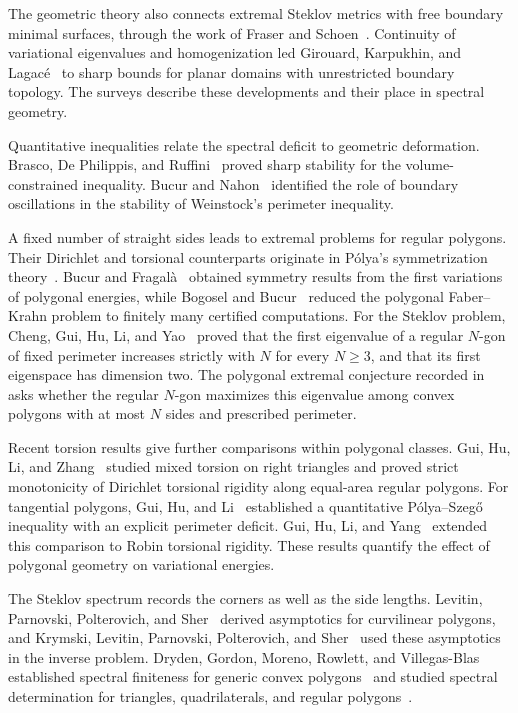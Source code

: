 \documentclass[11pt]{amsart}
\theoremstyle{remark}\newtheorem{remark}[theorem]{Remark}
\numberwithin{equation}{section}
\begin{document}
The geometric theory also connects extremal Steklov metrics with free
boundary minimal surfaces, through the work of Fraser and
Schoen~\cite{FraserSchoen2011,FraserSchoen2016}.
Continuity of variational eigenvalues and homogenization led Girouard,
Karpukhin, and Lagac\'e~\cite{GirouardKarpukhinLagace2021} to sharp bounds
for planar domains with unrestricted boundary topology. The surveys
\cite{GirouardPolterovich2017,ColboisEtAl2024} describe these developments
and their place in spectral geometry.

Quantitative inequalities relate the spectral deficit to geometric
deformation. Brasco, De Philippis, and Ruffini~\cite{BrascoEtAl2012}
proved sharp stability for the volume-constrained inequality.
Bucur and Nahon~\cite{BucurNahon2021} identified the role of boundary
oscillations in the stability of Weinstock's perimeter inequality.

A fixed number of straight sides leads to extremal problems for regular
polygons. Their Dirichlet and torsional counterparts originate in
P\'olya's symmetrization theory~\cite{Polya1948}.
Bucur and Fragal\`a~\cite{BucurFragala2021} obtained symmetry results from
the first variations of polygonal energies, while Bogosel and
Bucur~\cite{BogoselBucur2024} reduced the polygonal Faber--Krahn problem
to finitely many certified computations. For the Steklov problem, Cheng,
Gui, Hu, Li, and Yao~\cite{ChengEtAl2026} proved that the first eigenvalue
of a regular $N$-gon of fixed perimeter increases strictly with $N$ for
every $N\ge3$, and that its first eigenspace has dimension two. The
polygonal extremal conjecture recorded in
\cite[Conjecture~1.1]{ChengEtAl2026} asks whether the regular $N$-gon
maximizes this eigenvalue among convex polygons with at most $N$ sides
and prescribed perimeter.

Recent torsion results give further comparisons within polygonal classes.
Gui, Hu, Li, and Zhang~\cite{GuiHuLiZhang2026} studied mixed torsion on
right triangles and proved strict monotonicity of Dirichlet torsional
rigidity along equal-area regular polygons. For tangential polygons, Gui,
Hu, and Li~\cite{GuiHuLi2026} established a quantitative
P\'olya--Szeg\H{o} inequality with an explicit perimeter deficit.
Gui, Hu, Li, and Yang~\cite{GuiHuLiYang2026} extended this comparison to
Robin torsional rigidity. These results quantify the effect of polygonal
geometry on variational energies.

The Steklov spectrum records the corners as well as the side lengths.
Levitin, Parnovski, Polterovich, and Sher~\cite{LevitinEtAl2022} derived
asymptotics for curvilinear polygons, and Krymski, Levitin, Parnovski,
Polterovich, and Sher~\cite{KrymskiEtAl2021} used these asymptotics in the
inverse problem. Dryden, Gordon, Moreno, Rowlett, and
Villegas-Blas established spectral finiteness for generic convex
polygons~\cite{DrydenEtAl2025} and studied spectral determination for
triangles, quadrilaterals, and regular polygons~\cite{DrydenEtAl2026}.
\end{document}

